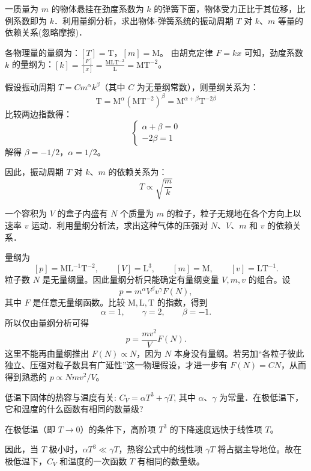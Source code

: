 \begin{exercise}\label{ex:1.10}
一质量为 $m$ 的物体悬挂在劲度系数为 $k$ 的弹簧下面，物体受力正比于其位移，比例系数即为 $k$．利用量纲分析，求出物体-弹簧系统的振动周期 $T$ 对 $k$、$m$ 等量的依赖关系(忽略摩擦)．
\end{exercise}
\begin{solution}
各物理量的量纲为：$[T] = \text{T}$，$[m] = \text{M}$。
由胡克定律 $F = kx$ 可知，劲度系数 $k$ 的量纲为：$[k] = \frac{[F]}{[x]} = \frac{\text{M}\text{L}\text{T}^{-2}}{\text{L}} = \text{M}\text{T}^{-2}$。

假设振动周期 $T = C m^\alpha k^\beta$（其中 $C$ 为无量纲常数），则量纲关系为：
$$ \text{T} = \text{M}^\alpha (\text{M}\text{T}^{-2})^\beta = \text{M}^{\alpha+\beta} \text{T}^{-2\beta} $$
比较两边指数得：
$$ \begin{cases} \alpha + \beta = 0 \\ -2\beta = 1 \end{cases} $$
解得 $\beta = -1/2$，$\alpha = 1/2$。

因此，振动周期 $T$ 对 $k$、$m$ 的依赖关系为：
$$ T \propto \sqrt{\frac{m}{k}} $$
\end{solution}

\begin{exercise}\label{ex:1.11}
一个容积为 $V$ 的盒子内盛有 $N$ 个质量为 $m$ 的粒子，粒子无规地在各个方向上以速率 $v$ 运动．利用量纲分析法，求出这种气体的压强对 $N$、$V$、$m$ 和 $v$ 的依赖关系．
\end{exercise}
\begin{solution}
量纲为
$$
[p]=\mathrm{M L^{-1}T^{-2}},\qquad [V]=\mathrm{L^3},\qquad [m]=\mathrm{M},\qquad [v]=\mathrm{LT^{-1}}.
$$
粒子数 $N$ 是无量纲量。因此量纲分析只能确定有量纲变量 $V,m,v$ 的组合。设
$$
p=m^\alpha V^\beta v^\gamma F(N),
$$
其中 $F$ 是任意无量纲函数。比较 $\mathrm M,\mathrm L,\mathrm T$ 的指数，得到
$$
\alpha=1,\qquad \gamma=2,\qquad \beta=-1.
$$
所以仅由量纲分析可得
$$
\boxed{\displaystyle p=\frac{mv^2}{V}F(N)}.
$$
这里不能再由量纲推出 $F(N)\propto N$，因为 $N$ 本身没有量纲。若另加“各粒子彼此独立、压强对粒子数具有广延性”这一物理假设，才进一步有 $F(N)=CN$，从而得到熟悉的 $p\propto Nmv^2/V$。
\end{solution}

\begin{exercise}\label{ex:1.12}
低温下固体的热容与温度有关: $C_V = \alpha T^3 + \gamma T$, 其中 $\alpha$、$\gamma$ 为常量．在极低温下，它和温度的什么函数有相同的数量级?
\end{exercise}
\begin{solution}
在极低温（即 $T \to 0$）的条件下，高阶项 $T^3$ 的下降速度远快于线性项 $T$。

因此，当 $T$ 极小时，$\alpha T^3 \ll \gamma T$，热容公式中的线性项 $\gamma T$ 将占据主导地位。故在极低温下，$C_V$ 和温度的一次函数 $T$ 有相同的数量级。
\end{solution}

